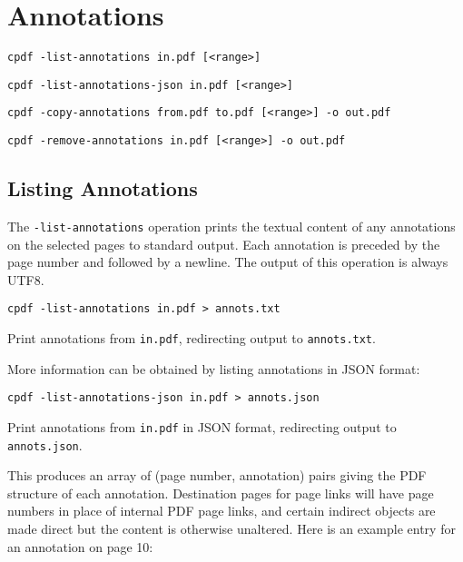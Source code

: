 \documentclass{book}
\begin{document}
\chapter{Annotations}\label{chap:10}
  \begin{framed}
  \small\noindent\verb!cpdf -list-annotations in.pdf [<range>]!

  \vspace{1.5mm}
  \small\noindent\verb!cpdf -list-annotations-json in.pdf [<range>]!

  \vspace{1.5mm}
  \small\noindent\verb!cpdf -copy-annotations from.pdf to.pdf [<range>] -o out.pdf!

  \vspace{1.5mm}
  \small\noindent\verb!cpdf -remove-annotations in.pdf [<range>] -o out.pdf!
  \end{framed}

  \section{Listing Annotations}
  The \texttt{-list-annotations} operation prints the textual content of any
annotations on the selected pages to standard output. Each annotation is preceded by the page number and followed by a newline. The output of this operation is always UTF8.
  \begin{framed}
    \small\verb!cpdf -list-annotations in.pdf > annots.txt!
    
    \vspace{2.5mm}
    \noindent Print annotations from \texttt{in.pdf}, redirecting output to \texttt{annots.txt}.
  \end{framed}

More information can be obtained by listing annotations in JSON format:

  \begin{framed}
    \small\verb!cpdf -list-annotations-json in.pdf > annots.json!
    
    \vspace{2.5mm}
    \noindent Print annotations from \texttt{in.pdf} in JSON format, redirecting output to \texttt{annots.json}.
  \end{framed}

This produces an array of (page number, annotation) pairs giving the PDF structure of each annotation. Destination pages for page links will have page numbers in place of internal PDF page links, and certain indirect objects are made direct but the content is otherwise unaltered. Here is an example entry for an annotation on page 10:
\end{document}
